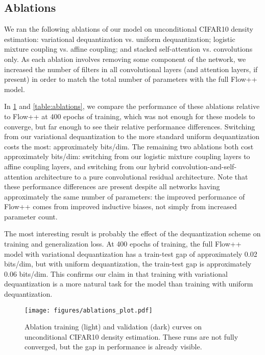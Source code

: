 \documentclass{article}
\begin{document}
\subsection{Ablations}

We ran the following ablations of our model on unconditional CIFAR10 density estimation:
variational dequantization vs. uniform dequantization; logistic mixture coupling vs. affine coupling; and stacked self-attention vs. convolutions only. As each ablation involves removing some component of the network, we increased the number of filters in all convolutional layers (and attention layers, if present) in order to match the total number of parameters with the full Flow++ model.

In \cref{fig:ablations} and \cref{table:ablations}, we compare the performance of these ablations relative to Flow++ at 400 epochs of training, which was not enough for these models to converge, but far enough to see their relative performance differences. 
Switching from our variational dequantization to the more standard uniform dequantization costs the most: approximately  bits/dim. The remaining two ablations both cost approximately  bits/dim: switching from our logistic mixture coupling layers to affine coupling layers, and switching from our hybrid convolution-and-self-attention architecture to a pure convolutional residual architecture. Note that these performance differences are present despite all networks having approximately the same number of parameters: the improved performance of Flow++ comes from improved inductive biases, not simply from increased parameter count.

The most interesting result is probably the effect of the dequantization scheme on training and generalization loss. At 400 epochs of training, the full Flow++ model with variational dequantization has a train-test gap of approximately 0.02 bits/dim, but with uniform dequantization, the train-test gap is approximately 0.06 bits/dim. This confirms our claim in  that training with variational dequantization is a more natural task for the model than training with uniform dequantization.


\begin{figure}[h]
\begin{center}
\texttt{[image: figures/ablations\_plot.pdf]}
\end{center}
\caption{Ablation training (light) and validation (dark) curves on unconditional CIFAR10 density estimation. These runs are not fully converged, but the gap in performance is already visible.}
\label{fig:ablations}
\end{figure}
\end{document}
